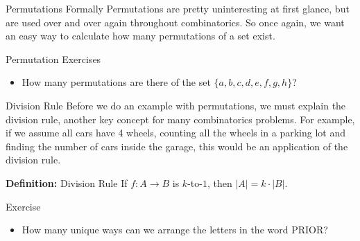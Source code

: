 \documentclass{beamer}
\begin{document}
\begin{frame}{Permutations Formally}
    Permutations are pretty uninteresting at first glance, but are used over and over again throughout combinatorics. So once again, we want an easy way to calculate how many permutations of a set exist.
    
\end{frame}

\begin{frame}{Permutation Exercises}
    \begin{itemize}
        \item How many permutations are there of the set $\{a, b, c, d, e, f, g, h\}$?
    \end{itemize}
\end{frame}

\begin{frame}{Division Rule}
    Before we do an example with permutations, we must explain the division rule, another key concept for many combinatorics problems. For example, if we assume all cars have 4 wheels, counting all the wheels in a parking lot and finding the number of cars inside the garage, this would be an application of the division rule. \vspace{5mm}
    
    \textbf{Definition:} Division Rule \newline
    If $f: A \rightarrow B$ is $k$-to-$1$, then $|A| = k\cdot |B|$.
\end{frame}

\begin{frame}{Exercise}
    \begin{itemize}
        \item How many unique ways can we arrange the letters in the word PRIOR? 
    \end{itemize}
\end{frame}
\end{document}
